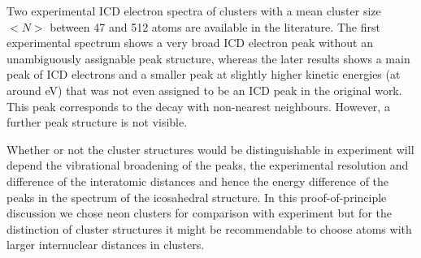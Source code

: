 Two experimental ICD electron spectra of clusters
with a mean cluster size $<N>$ between 47 and 512 atoms
are available in the literature.
\cite{Marburger03,Barth06_2} 
The first experimental spectrum shows a very
broad ICD electron peak without an unambiguously assignable peak structure,
whereas the later results shows a main peak of ICD electrons and a smaller peak
at slightly higher kinetic energies (at around \unit[3]{eV})
that was not even assigned to be an ICD peak in the original work. This peak
corresponds to the decay with non-nearest neighbours. However, a further peak
structure is not visible.

Whether or not the cluster structures would be distinguishable in experiment
will depend the vibrational broadening of the peaks, the experimental
resolution and difference of the interatomic distances
and hence the energy difference of the peaks in the spectrum of the
icosahedral structure. In this proof-of-principle discussion
we chose neon clusters for comparison with experiment but for the distinction
of cluster structures it might be recommendable to choose atoms with larger
internuclear distances in clusters.

